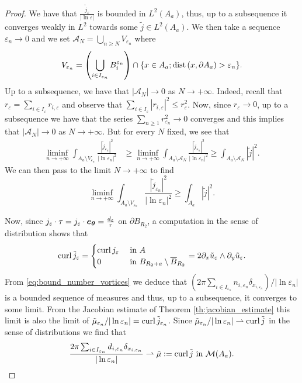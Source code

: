 \documentclass[12pt,reqno]{amsart}
\def\e {{\varepsilon}}
\renewcommand{\vec}[1]{\text{\boldmath $#1$}}
\def\dist{{\rm dist\,}}
\def\curl{{\rm curl\,}}
\def \p {\partial}
\numberwithin{equation}{section}
\begin{document}
\begin{proof}
We have that \(\frac{\tilde{j}_\e}{|\ln \e|}\) is bounded in \(L^2(A_a)\), thus, up to a subsequence it converges weakly in \(L^2\) towards some \(\tilde{j}\in L^2(A_a)\). We then take a sequence \(\e_n \to 0\) and we set \(\mathcal{A}_N=\bigcup_{n\geq N} V_{\e_n}\) where
\begin{equation*}
V_{\e_n}=\left( \bigcup_{i\in I_{\e_n}} B_i^{\e_n} \right) \cap \{x\in A_a; \dist (x,\p A_a)>\e_n\} .
\end{equation*}
Up to a subsequence, we have that \( |\mathcal{A}_N|\to 0\) as \(N \to +\infty\). Indeed, recall that \(r_{\e}=\sum_{i \in I_\e} r_{i,\e}\) and observe that \(\sum_{i \in I_\e} |r_{i,\e}|^2\leq r_\e^2\). Now, since \(r_\e\to 0\), up to a subsequence we have that the series \(\sum_{n\geq 1} r_{\e_n}^2\to 0\) converges and this implies that \(|\mathcal{A}_N|\to 0\) as \(N\to +\infty\).
But for every \(N\) fixed, we see that
\begin{align*}
\liminf_{n \to +\infty} \int_{A_a \setminus V_{\e_n}}\frac{|\tilde{j}_{\e_n}|^2}{|\ln \e_n|^2} & \geq \liminf_{n \to +\infty} \int_{A_a\setminus \mathcal{A}_N}\frac{|\tilde{j}_{\e_n}|^2}{|\ln \e_n|^2} \geq \int_{A_a \setminus \mathcal{A}_N} |\tilde{j}|^2.
\end{align*}
We can then pass to the limit \(N \to +\infty\) to find
\begin{equation}\label{eq:interaction_part}
\liminf_{n \to +\infty} \int_{A_a \setminus V_{\e_n}}\frac{|\tilde{j}_{\e_n}|^2}{|\ln \e_n|^2} \geq \int_{A_a} |\tilde{j}|^2.
\end{equation}

Now, since \(j_\e\cdot \tau=j_\e\cdot \vec{e_\theta}=\frac{d_\e}{r}\) on \(\p B_{R_2}\), a computation in the sense of distribution shows that
\begin{equation*}
\curl \tilde{j}_\e =\begin{cases}
\curl j_\e &\text{ in } A \\
0 & \text{ in } B_{R_2+a} \setminus \overline{B}_{R_2}
\end{cases}=2\p_x \tilde{u}_\e\wedge \p_y \tilde{u}_\e.
\end{equation*}
From \eqref{eq:bound_number_vortices} we deduce that \(\left( 2\pi \sum_{i\in I_{\e_n}} n_{i,\e_n}\delta_{x_{i,\e_n}}\right) /|\ln {\e_n}|\) is a  bounded sequence of measures and thus, up to a subsequence, it converges to some limit. From the Jacobian estimate of Theorem \ref{th:jacobian_estimate} this limit is also the limit of \(\tilde{\mu}_{\e_n}/|\ln \e_n|=\curl \tilde{j}_{\e_n}\). Since  \(\tilde{\mu}_{\e_n}/|\ln \e_n| \rightharpoonup \curl \tilde{j}\) in the sense of distributions we find that
\begin{equation*}
\frac{2\pi \sum_{i\in I_{\e_n}} d_{i,\e_n}\delta_{x_{i,\e_n}}}{|\ln {\e_n}|}\rightharpoonup \tilde{\mu}:=\curl \tilde{j} \text{ in } \mathcal{M}(A_a).
\end{equation*}


\end{proof}
\end{document}

